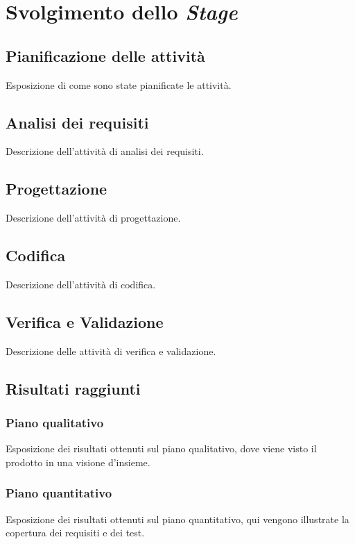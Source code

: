 \chapter{Svolgimento dello \textit{Stage}}
\label{chap:svolgimento-stage}

\section{Pianificazione delle attività}\noindent
Esposizione di come sono state pianificate le attività.

\section{Analisi dei requisiti}\noindent
Descrizione dell'attività di analisi dei requisiti.

\section{Progettazione}\noindent
Descrizione dell'attività di progettazione.

\section{Codifica}\noindent
Descrizione dell'attività di codifica.

\section{Verifica e Validazione}\noindent
Descrizione delle attività di verifica e validazione.

\section{Risultati raggiunti}

\subsection{Piano qualitativo}\noindent
Esposizione dei risultati ottenuti sul piano qualitativo, dove viene visto il prodotto in una visione d'insieme.

\subsection{Piano quantitativo}\noindent
Esposizione dei risultati ottenuti sul piano quantitativo, qui vengono illustrate la copertura dei requisiti e dei test.